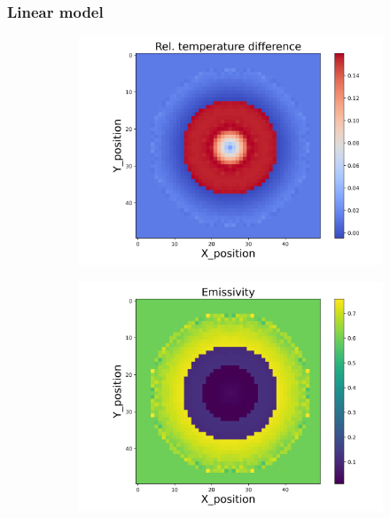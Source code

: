 \subsubsection{Linear model}

\begin{figure}[htbp]
    \centering
    \begin{minipage}{\textwidth}
        \centering
        \begin{subfigure}{0.49\textwidth}
            \centering
            \includegraphics[width=\textwidth]{figures/raw_data/21/linear/T_bias.jpg}
        \end{subfigure}
        \begin{subfigure}{0.49\textwidth}
            \centering
            \includegraphics[width=\textwidth]{figures/raw_data/21/linear/emi_cal.jpg}

\end{subfigure}
\end{minipage}
\end{figure}
